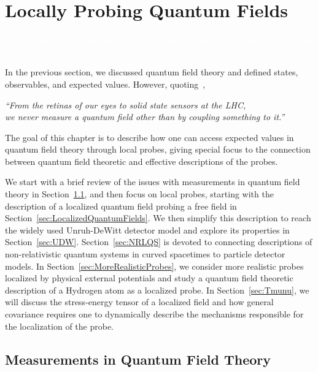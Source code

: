 \documentclass[letterpaper,12pt,titlepage,oneside,final]{book}
\begin{document}
%

\chapter{Locally Probing Quantum Fields}\label{chap:meas}

\vspace{-10mm}
{\tiny\textcolor{white}{If you think that this introduction for the main chapter is too short, just read the introduction, there is way more motivation there.}}
\vspace{3mm}

In the previous section, we discussed quantum field theory and defined states, observables, and expected values. However, quoting~\cite{us},
\begin{center}
    \textit{``From the retinas of our eyes to solid state sensors at the LHC, \\we never measure a quantum field other than by coupling something to it.''}   
\end{center}
\noindent The goal of this chapter is to describe how one can access expected values in quantum field theory through local probes, giving special focus to the connection between quantum field theoretic and effective descriptions of the probes.

We start with a brief review of the issues with measurements in quantum field theory in Section~\ref{sec:meas}, and then focus on local probes, starting with the description of a localized quantum field probing a free field in Section~\ref{sec:LocalizedQuantumFields}. We then simplify this description to reach the widely used Unruh-DeWitt detector model and explore its properties in Section~\ref{sec:UDW}. Section~\ref{sec:NRLQS} is devoted to connecting descriptions of non-relativistic quantum systems in curved spacetimes to particle detector models. In Section~\ref{sec:MoreRealisticProbes}, we consider more realistic probes localized by physical external potentials and study a quantum field theoretic description of a Hydrogen atom as a localized probe. In Section~\ref{sec:Tmunu}, we will discuss the stress-energy tensor of a localized field and how general covariance requires one to dynamically describe the mechanisms responsible for the localization of the probe. 

\section{Measurements in Quantum Field Theory}\label{sec:meas}
\end{document}
